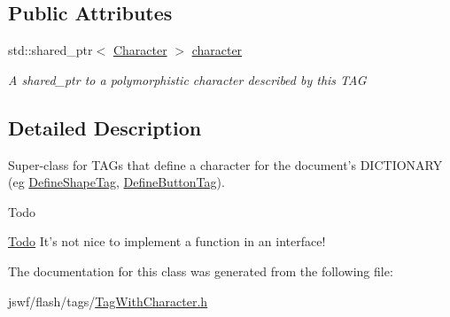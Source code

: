 \subsection*{Public Attributes}
\begin{DoxyCompactItemize}
\item 
\hypertarget{classjswf_1_1flash_1_1tags_1_1_tag_with_character_ab97d72ea9f505474608bad8fbd4f9431}{std\+::shared\+\_\+ptr$<$ \hyperlink{classjswf_1_1flash_1_1_character}{Character} $>$ \hyperlink{classjswf_1_1flash_1_1tags_1_1_tag_with_character_ab97d72ea9f505474608bad8fbd4f9431}{character}}\label{classjswf_1_1flash_1_1tags_1_1_tag_with_character_ab97d72ea9f505474608bad8fbd4f9431}

\begin{DoxyCompactList}\small\item\em A {\ttfamily shared\+\_\+ptr} to a polymorphistic character described by this {\ttfamily T\+A\+G} \end{DoxyCompactList}\end{DoxyCompactItemize}


\subsection{Detailed Description}
Super-\/class for {\ttfamily T\+A\+G}s that define a character for the document's {\ttfamily D\+I\+C\+T\+I\+O\+N\+A\+R\+Y} (eg \hyperlink{classjswf_1_1flash_1_1tags_1_1_define_shape_tag}{Define\+Shape\+Tag}, \hyperlink{classjswf_1_1flash_1_1tags_1_1_define_button_tag}{Define\+Button\+Tag}). 

\begin{DoxyRefDesc}{Todo}
\item[\hyperlink{todo__todo000021}{Todo}]It's not nice to implement a function in an interface! \end{DoxyRefDesc}


The documentation for this class was generated from the following file\+:\begin{DoxyCompactItemize}
\item 
jswf/flash/tags/\hyperlink{_tag_with_character_8h}{Tag\+With\+Character.\+h}\end{DoxyCompactItemize}
